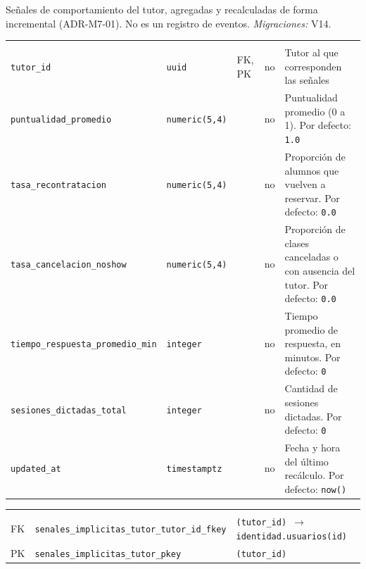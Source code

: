 Señales de comportamiento del tutor, agregadas y recalculadas de forma incremental (ADR-M7-01). No es un registro de eventos. \emph{Migraciones:} V14.

{\small
\begin{xltabular}{\textwidth}{@{}>{\raggedright\arraybackslash}p{3.6cm} >{\raggedright\arraybackslash}p{2.3cm} >{\raggedright\arraybackslash}p{1cm} >{\centering\arraybackslash}p{0.85cm} L@{}}
    \toprule
     &  &  &  &  \\
    \midrule
    \endfirsthead
    \toprule
     &  &  &  &  \\
    \midrule
    \endhead
    \bottomrule
    \endfoot
    \texttt{tutor\_\allowbreak{}id} & \texttt{uuid} & FK, PK & no & Tutor al que corresponden las señales \\
    \texttt{puntualidad\_\allowbreak{}promedio} & \texttt{numeric(\allowbreak{}5,\allowbreak{}4)} &  & no & Puntualidad promedio (0 a 1). Por defecto: \texttt{1.0} \\
    \texttt{tasa\_\allowbreak{}recontratacion} & \texttt{numeric(\allowbreak{}5,\allowbreak{}4)} &  & no & Proporción de alumnos que vuelven a reservar. Por defecto: \texttt{0.0} \\
    \texttt{tasa\_\allowbreak{}cancelacion\_\allowbreak{}noshow} & \texttt{numeric(\allowbreak{}5,\allowbreak{}4)} &  & no & Proporción de clases canceladas o con ausencia del tutor. Por defecto: \texttt{0.0} \\
    \texttt{tiempo\_\allowbreak{}respuesta\_\allowbreak{}promedio\_\allowbreak{}min} & \texttt{integer} &  & no & Tiempo promedio de respuesta, en minutos. Por defecto: \texttt{0} \\
    \texttt{sesiones\_\allowbreak{}dictadas\_\allowbreak{}total} & \texttt{integer} &  & no & Cantidad de sesiones dictadas. Por defecto: \texttt{0} \\
    \texttt{updated\_\allowbreak{}at} & \texttt{timestamptz} &  & no & Fecha y hora del último recálculo. Por defecto: \texttt{now(\allowbreak{})} \\
\end{xltabular}
}

{\small
\begin{xltabular}{\textwidth}{@{}>{\raggedright\arraybackslash}p{1.7cm} >{\raggedright\arraybackslash}p{4.6cm} L@{}}
    \toprule
     &  &  \\
    \midrule
    \endfirsthead
    \toprule
     &  &  \\
    \midrule
    \endhead
    \bottomrule
    \endfoot
    FK & \texttt{senales\_\allowbreak{}implicitas\_\allowbreak{}tutor\_\allowbreak{}tutor\_\allowbreak{}id\_\allowbreak{}fkey} & \texttt{(\allowbreak{}tutor\_\allowbreak{}id) $\rightarrow$ identidad.usuarios(\allowbreak{}id)} \\
    PK & \texttt{senales\_\allowbreak{}implicitas\_\allowbreak{}tutor\_\allowbreak{}pkey} & \texttt{(\allowbreak{}tutor\_\allowbreak{}id)} \\
\end{xltabular}
}

